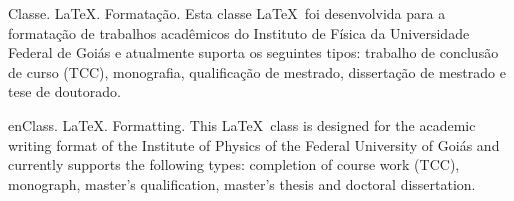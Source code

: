 
\begin{resumo}{pt}{Classe. \LaTeX. Formatação.}
Esta classe \LaTeX\ foi desenvolvida para a formatação de trabalhos acadêmicos do Instituto de Física da Universidade Federal de Goiás e atualmente suporta os seguintes tipos: trabalho de conclusão de curso (TCC), monografia, qualificação de mestrado, dissertação de mestrado e tese de doutorado.
\end{resumo}

\begin{resumo}{en}{Class. \LaTeX. Formatting.}
This \LaTeX\ class is designed for the academic writing format of the Institute of Physics of the Federal University of Goiás and currently supports the following types: completion of course work (TCC), monograph, master's qualification, master's thesis and doctoral dissertation.
\end{resumo}